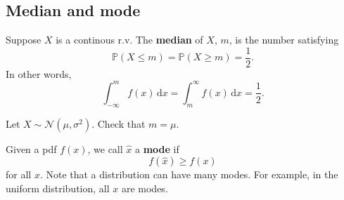 \subsection{Median and mode}
\begin{definition}
    Suppose $X$ is a continous r.v. The \textbf{median} of $X$, $m$, is the number satisfying 
    \[
        \mathbb{P}(X\le m)=\mathbb{P}(X\ge m)=\frac{1}{2}.
    \]
    In other words,
    \[
        \int_{-\infty}^{m} f(x) \,\mathrm{d}x=\int_{m}^{\infty} f(x) \,\mathrm{d}x = \frac{1}{2}.
    \]
\end{definition}
\begin{example}
    Let $ X \sim \mathcal{N}(\mu,\sigma^2) $. Check that $ m=\mu $.
\end{example}
\begin{definition}[Mode]
    Given a pdf $f(x)$, we call $\hat x$ a \textbf{mode} if
    \[
        f(\hat x) \geq f(x)
    \]
    for all $x$. Note that a distribution can have many modes. For example, in the uniform distribution, all $x$ are modes.
\end{definition}
